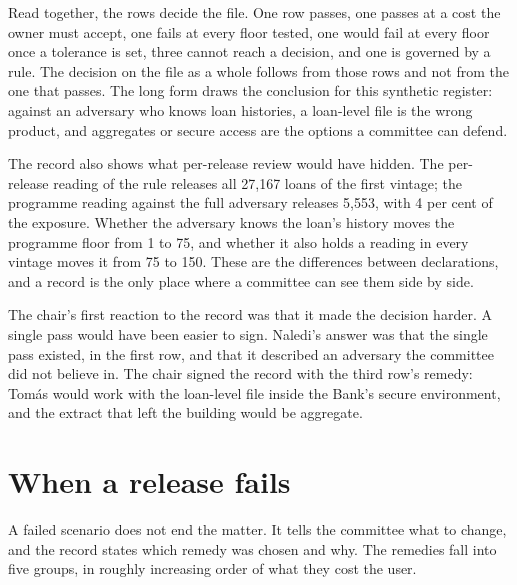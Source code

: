 Read together, the rows decide the file. One row passes, one passes at a cost the
owner must accept, one fails at every floor tested, one would fail at every floor
once a tolerance is set, three cannot reach a decision, and one is governed by a rule.
The decision on the file as a whole follows from those rows and not from the one that
passes. The long form draws the conclusion for this synthetic register: against an
adversary who knows loan histories, a loan-level file is the wrong product, and
aggregates or secure access are the options a committee can defend.

The record also shows what per-release review would have hidden. The per-release
reading of the rule releases all 27{,}167 loans of the first vintage; the programme
reading against the full adversary releases 5{,}553, with 4 per cent of the exposure.
Whether the adversary knows the loan's history moves the programme floor from 1 to
75, and whether it also holds a reading in every vintage moves it from 75 to 150.
These are the differences between declarations, and a record is the only place where
a committee can see them side by side.

The chair's first reaction to the record was that it made the decision harder. A
single pass would have been easier to sign. Naledi's answer was that the single pass
existed, in the first row, and that it described an adversary the committee did not
believe in. The chair signed the record with the third row's remedy: Tomás would
work with the loan-level file inside the Bank's secure environment, and the extract
that left the building would be aggregate.

\section{When a release fails}

A failed scenario does not end the matter. It tells the committee what to change,
and the record states which remedy was chosen and why. The remedies fall into five
groups, in roughly increasing order of what they cost the user.

